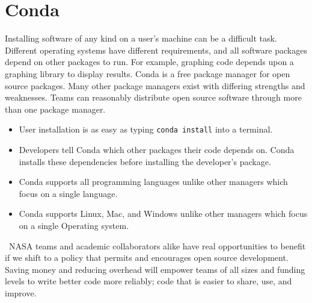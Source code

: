 \documentclass[12pt, letterpaper]{article}
\begin{document}
  \section*{\small Conda}

  Installing software of any kind on a user's machine can be a difficult task.
  Different operating systems have different requirements, and all software
  packages depend on other packages to run. For example, graphing code depends
  upon a graphing library to display results. Conda\cite{conda} is a free
  package manager for open source packages. Many other package managers exist
  with differing strengths and weaknesses. Teams can reasonably distribute open
  source software through more than one package manager.
  \begin{itemize}
      \item User installation is as easy as typing \texttt{conda install} into
        a terminal.
      \item Developers tell Conda which other packages their code depends on.
        Conda installs these dependencies before installing the developer's
        package.
      \item Conda supports all programming languages unlike other
        managers which focus on a single language.
      \item Conda supports Linux, Mac, and Windows unlike other
        managers which focus on a single Operating system.
  \end{itemize}

  \
  NASA teams and academic collaborators alike have real opportunities to
  benefit if we shift to a policy that permits and encourages open source
  development. Saving money and reducing overhead will empower teams of all
  sizes and funding levels to write better code more reliably; code that is
  easier to share, use, and improve.
\printbibliography
\end{document}
